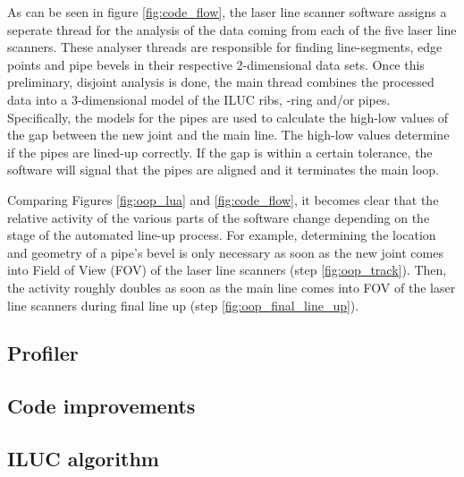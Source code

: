 As can be seen in figure \ref{fig:code_flow}, the laser line scanner software assigns a seperate thread for the analysis of the data coming from each of the five laser line scanners. These analyser threads are responsible for finding line-segments, edge points and pipe bevels in their respective 2-dimensional data sets. Once this preliminary, disjoint analysis is done, the main thread combines the processed data into a 3-dimensional model of the ILUC ribs, -ring and/or pipes. Specifically, the models for the pipes are used to calculate the high-low values of the gap between the new joint and the main line. The high-low values determine if the pipes are lined-up correctly. If the gap is within a certain tolerance, the software will signal that the pipes are aligned and it terminates the main loop.

Comparing Figures \ref{fig:oop_lua} and \ref{fig:code_flow}, it becomes clear that the relative activity of the various parts of the software change
depending on the stage of the automated line-up process. For example, determining the location and geometry of a pipe's bevel is only necessary as soon as
the new joint comes into Field of View (FOV) of the laser line scanners (step \ref{fig:oop_track}). Then, the activity roughly doubles as soon as the main line
comes into FOV of the laser line scanners during final line up (step \ref{fig:oop_final_line_up}).

\subsection{Profiler} \label{ssec:code_refactoring}

\subsection{Code improvements} \label{ssec:code_improvements}

\subsection{ILUC algorithm} \label{ssec:ILUC_algorithm}